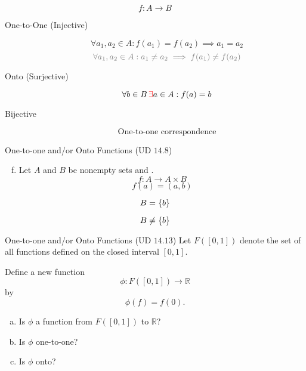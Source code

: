 \begin{frame}{}
  \[
    f: A \to B
  \]
  \begin{description}
    \item[One-to-One (Injective)] 
      \[
	\forall a_1, a_2 \in A: f(a_1) = f(a_2) \implies a_1 = a_2 
      \]
      \[
	\textcolor{gray}{\forall a_1, a_2 \in A: a_1 \neq a_2 \implies f(a_1) \neq f(a_2)}
      \]
    \item[Onto (Surjective)]
      \[
	\forall b \in B \, \textcolor{red}{\exists} a \in A: f(a) = b
      \]
    \item[Bijective] 
      \[
	\text{One-to-one correspondence}
      \]
  \end{description}
\end{frame}

\begin{frame}{}
  \begin{exampleblock}{One-to-one and/or Onto Functions (UD $14.8$)}
    \begin{enumerate}[(a)]
      \setcounter{enumi}{5}
    \item Let $A$ and $B$ be nonempty sets and .
      \[
	f : A \to A \times B
      \]
      \[
	f(a) = (a,b)
      \]
    \end{enumerate}
  \end{exampleblock}

  \pause
  \[
    B = \{b\}
  \]

  \[
    B \neq \{b\}
  \]
\end{frame}

\begin{frame}{}
  \begin{exampleblock}{One-to-one and/or Onto Functions (UD $14.13$)}
    Let $F([0,1])$ denote the set of all  functions defined on the closed interval $[0,1]$.

    Define a new function
    \[
      \phi: F([0,1]) \to \mathbb{R}
    \]
    by 
    \[
      \phi(f) = f(0).
    \]

    \begin{enumerate}[(a)]
      \item Is $\phi$ a function from $F([0,1])$ to $\mathbb{R}$?
      \item Is $\phi$ one-to-one?
      \item Is $\phi$ onto?
    \end{enumerate}
  \end{exampleblock}
\end{frame}

